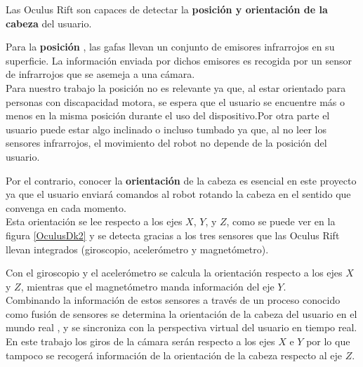 \documentclass[twoside, 11pt]{epstfg}
\begin{document}
Las Oculus Rift son capaces de detectar la \textbf{posición y orientación de la cabeza} del usuario.

Para la \textbf{posición} , las gafas llevan un conjunto de emisores infrarrojos en su superficie. La información enviada por dichos emisores es recogida por un sensor de infrarrojos que se asemeja a una cámara.\\
Para nuestro trabajo la posición no es relevante ya que, al estar orientado para personas con discapacidad motora,  se espera que el usuario se encuentre más o menos en la misma posición durante el uso del dispositivo.Por otra parte el usuario puede estar algo inclinado o incluso tumbado ya que, al no leer los sensores infrarrojos, el movimiento del robot no depende de la posición del usuario.


Por el contrario, conocer la \textbf{orientación} de la cabeza es esencial en este proyecto ya que el usuario enviará comandos al robot rotando la cabeza en el sentido que convenga en cada momento.\\Esta orientación se lee respecto a los ejes $X$, $Y$, y $Z$, como se puede ver en la figura \ref{OculusDk2}  y se detecta gracias a los tres sensores que las Oculus Rift llevan integrados (giroscopio, acelerómetro y magnetómetro).


Con el giroscopio y el acelerómetro se calcula la orientación respecto a los ejes $X$ y $Z$, mientras que el magnetómetro manda información del eje $Y$.\\Combinando la información de estos sensores a través de un proceso conocido como fusión de sensores se determina la orientación de la cabeza del usuario en el mundo real , y se sincroniza con la perspectiva virtual del usuario en tiempo real.\\
En este trabajo los giros de la cámara serán respecto a los ejes $X$ e $Y$ por lo que tampoco se recogerá información de la orientación de la cabeza respecto al eje $Z$.
\end{document}
